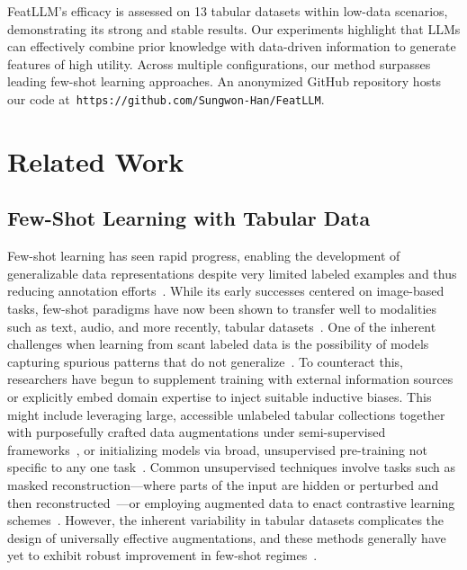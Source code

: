 \textsf{FeatLLM}’s efficacy is assessed on 13 tabular datasets within low-data scenarios, demonstrating its strong and stable results. Our experiments highlight that LLMs can effectively combine prior knowledge with data-driven information to generate features of high utility. Across multiple configurations, our method surpasses leading few-shot learning approaches. An anonymized GitHub repository hosts our code at~\texttt{https://github.com/Sungwon-Han/FeatLLM}.

\section{Related Work}

\subsection{Few-Shot Learning with Tabular Data} Few-shot learning has seen rapid progress, enabling the development of generalizable data representations despite very limited labeled examples and thus reducing annotation efforts~\cite{chen2018closer}. While its early successes centered on image-based tasks, few-shot paradigms have now been shown to transfer well to modalities such as text, audio, and more recently, tabular datasets~\cite{majumder2022few,nam2023stunt,schick2021exploiting}. One of the inherent challenges when learning from scant labeled data is the possibility of models capturing spurious patterns that do not generalize~\cite{bartlett2021deep}. To counteract this, researchers have begun to supplement training with external information sources or explicitly embed domain expertise to inject suitable inductive biases. This might include leveraging large, accessible unlabeled tabular collections together with purposefully crafted data augmentations under semi-supervised frameworks~\cite{ucar2021subtab,yoon2020vime}, or initializing models via broad, unsupervised pre-training not specific to any one task~\cite{somepalli2021saint}. Common unsupervised techniques involve tasks such as masked reconstruction—where parts of the input are hidden or perturbed and then reconstructed~\cite{arik2021tabnet,majmundar2022met}—or employing augmented data to enact contrastive learning schemes~\cite{bahri2022scarf,chen2020simple}. However, the inherent variability in tabular datasets complicates the design of universally effective augmentations, and these methods generally have yet to exhibit robust improvement in few-shot regimes~\cite{nam2023stunt}.

